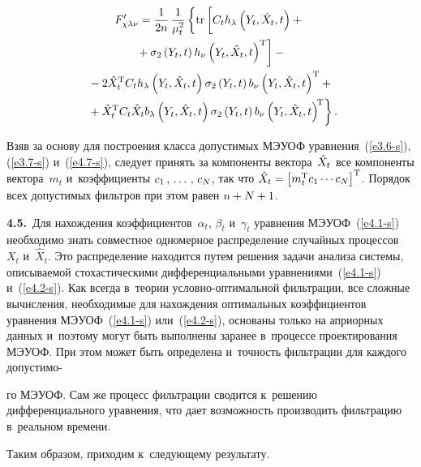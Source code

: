 \begin{multicols}{2}
\noindent
\begin{multline*}
 F_{\chi \la \nu}' =\fr{1}{2n}\,\fr{1}{\mu_t^2}\left\{ \mathrm{tr} 
 \left[ 
 \vphantom{\left(Y_t,\hat  X_t,t\right)^{\mathrm{T}}}
 C_t  h_\lambda \left(Y_t,\hat X_t,t\right) +{}\right.\right.\\
\left. {}+\sigma_2 \left(Y_t,t\right)
    h_\nu \left(Y_t,\hat X_t,t\right)^{\mathrm{T}}\right] -{}\\
{}-2\hat X_t^{\mathrm{T}} C_th_\lambda \left(Y_t,\hat X_t,t\right)\sigma_2
    \left(Y_t,t\right) b_\nu \left(Y_t,\hat X_t,t\right)^{\mathrm{T}}+{}\\
\left.{}+\hat X_t^{\mathrm{T}} C_t\hat X_t b_\lambda \left( Y_t,\hat X_t,t\right) 
\sigma_2 \left(Y_t,t\right) b_\nu \left(Y_t,\hat  X_t,t\right)^{\!\mathrm{T}}\right\}.\hspace*{-2.09656pt}
\end{multline*}

Взяв за основу для построения класса допустимых МЭУОФ уравнения~(\ref{e3.6-s}), 
(\ref{e3.7-s}) и~(\ref{e4.7-s}), следует принять за
компоненты вектора~${\hat X_t}$ все компоненты вектора~$m_t$ и~коэффициенты $c_1\,,\,\ldots\,,\, c_N$, 
так что $ \hXt\hm=\lk m_t^{\mathrm{T}} c_1\cdots
c_N\rk^{\mathrm{T}}$. Порядок всех допустимых фильтров при этом равен
$n\hm+N\hm+1$.

\textbf{4.5.}\ Для нахождения коэффициентов~$\alpha_t$, $\beta_t$ и~$\gamma_t$
уравнения МЭУОФ~(\ref{e4.1-s}) необходимо знать совместное одномерное
распределение случайных процессов~$X_t$ и~$\hat X_t$. Это
распределение находится  путем решения задачи анализа системы,
описываемой стохастическими дифференциальными уравнениями~(\ref{e4.1-s})
и~(\ref{e4.2-s}). Как всегда в~тео\-рии услов\-но-оп\-ти\-маль\-ной фильтрации,
все сложные вычисления, необходимые для нахождения оптимальных
коэффициентов уравнения МЭУОФ~(\ref{e4.1-s}) или~(\ref{e4.2-s}), основаны
только на априорных данных и~поэтому могут быть выполнены заранее
в~процессе проектирования МЭУОФ. При этом может быть определена
 и~точ\-ность фильтрации для каждого допустимо-\linebreak\vspace*{-12pt}

\pagebreak

\noindent
го МЭУОФ. Сам же процесс
фильтрации сводится к~решению дифференциального уравнения, что
дает возможность производить фильтрацию в~реальном времени.

Таким образом, приходим к~следующему результату.

\smallskip


\end{multicols}
